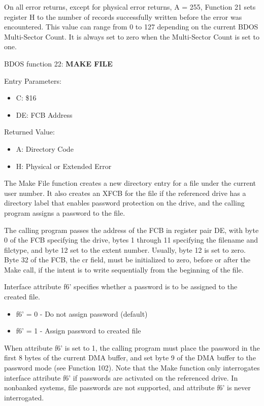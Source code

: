 On all error returns, except for physical error returns, A = 255,
Function 21 sets register H to the number of records successfully
written before the error was encountered. This value can range from 0
to 127 depending on the current BDOS Multi-Sector Count. It is always
set to zero when the Multi-Sector Count is set to one.

BDOS function 22: \textbf{MAKE FILE}

Entry Parameters:
\begin{itemize}
\item[] C: \$16
\item[] DE: FCB Address
\end{itemize}

Returned Value:
\begin{itemize}
\item[] A: Directory Code
\item[] H: Physical or Extended Error
\end{itemize}

The Make File function creates a new directory entry for a file under
the current user number. It also creates an XFCB for the file if the
referenced drive has a directory label that enables password
protection on the drive, and the calling program assigns a password to
the file.

The calling program passes the address of the FCB in register pair DE,
with byte 0 of the FCB specifying the drive, bytes 1 through 11
specifying the filename and filctype, and byte 12 set to the extent
number. Usually, byte 12 is set to zero. Byte 32 of the FCB, the cr
field, must be initialized to zero, before or after the Make call, if
the intent is to write sequentially from the beginning of the file.

Interface attribute f6' specifies whether a password is to be assigned
to the created file.

\begin{itemize}
\item f6' = 0 - Do not assign password (default)
\item f6' = 1 - Assign password to created file
\end{itemize}

When attribute f6' is set to 1, the calling program must place the
password in the first 8 bytes of the current DMA buffer, and set byte
9 of the DMA buffer to the password mode (see Function 102). Note that
the Make function only interrogates interface attribute f6' if
passwords are activated on the referenced drive. In nonbanked systems,
file passwords are not supported, and attribute f6' is never
interrogated.

